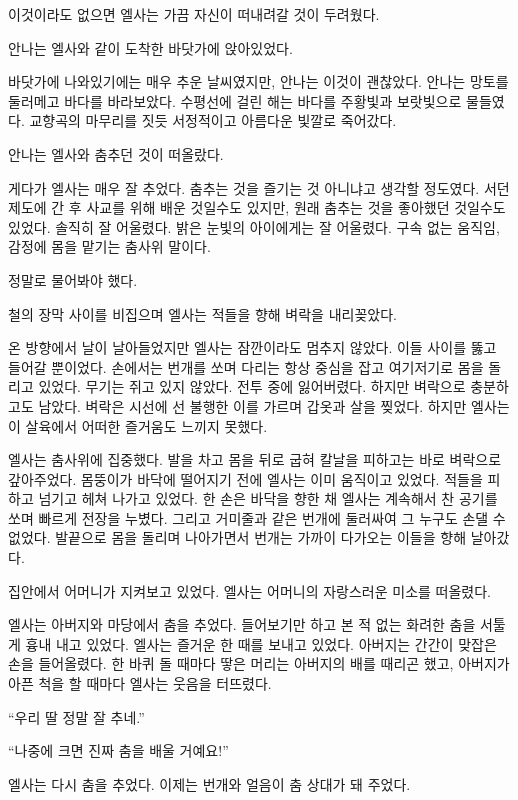 이것이라도 없으면 엘사는 가끔 자신이 떠내려갈 것이 두려웠다.

\textbreak

안나는 엘사와 같이 도착한 바닷가에 앉아있었다.

바닷가에 나와있기에는 매우 추운 날씨였지만, 안나는 이것이 괜찮았다. 안나는 망토를 둘러메고 바다를 바라보았다. 수평선에 걸린 해는 바다를 주황빛과 보랏빛으로 물들였다. 교향곡의 마무리를 짓듯 서정적이고 아름다운 빛깔로 죽어갔다.

안나는 엘사와 춤추던 것이 떠올랐다.

게다가 엘사는 매우 잘 추었다. 춤추는 것을 즐기는 것 아니냐고 생각할 정도였다. 서던 제도에 간 후 사교를 위해 배운 것일수도 있지만, 원래 춤추는 것을 좋아했던 것일수도 있었다. 솔직히 잘 어울렸다. 밝은 눈빛의 아이에게는 잘 어울렸다. 구속 없는 움직임, 감정에 몸을 맡기는 춤사위 말이다.

정말로 물어봐야 했다.

\textbreak

철의 장막 사이를 비집으며 엘사는 적들을 향해 벼락을 내리꽂았다.

온 방향에서 날이 날아들었지만 엘사는 잠깐이라도 멈추지 않았다. 이들 사이를 뚫고 들어갈 뿐이었다. 손에서는 번개를 쏘며 다리는 항상 중심을 잡고 여기저기로 몸을 돌리고 있었다. 무기는 쥐고 있지 않았다. 전투 중에 잃어버렸다. 하지만 벼락으로 충분하고도 남았다. 벼락은 시선에 선 불행한 이를 가르며 갑옷과 살을 찢었다. 하지만 엘사는 이 살육에서 어떠한 즐거움도 느끼지 못했다.

엘사는 춤사위에 집중했다. 발을 차고 몸을 뒤로 굽혀 칼날을 피하고는 바로 벼락으로 갚아주었다. 몸뚱이가 바닥에 떨어지기 전에 엘사는 이미 움직이고 있었다. 적들을 피하고 넘기고 헤쳐 나가고 있었다. 한 손은 바닥을 향한 채 엘사는 계속해서 찬 공기를 쏘며 빠르게 전장을 누볐다. 그리고 거미줄과 같은 번개에 둘러싸여 그 누구도 손댈 수 없었다. 발끝으로 몸을 돌리며 나아가면서 번개는 가까이 다가오는 이들을 향해 날아갔다.

집안에서 어머니가 지켜보고 있었다. 엘사는 어머니의 자랑스러운 미소를 떠올렸다.

엘사는 아버지와 마당에서 춤을 추었다. 들어보기만 하고 본 적 없는 화려한 춤을 서툴게 흉내 내고 있었다. 엘사는 즐거운 한 때를 보내고 있었다. 아버지는 간간이 맞잡은 손을 들어올렸다. 한 바퀴 돌 때마다 땋은 머리는 아버지의 배를 때리곤 했고, 아버지가 아픈 척을 할 때마다 엘사는 웃음을 터뜨렸다.

``우리 딸 정말 잘 추네.''

``나중에 크면 진짜 춤을 배울 거예요!''

엘사는 다시 춤을 추었다. 이제는 번개와 얼음이 춤 상대가 돼 주었다.

